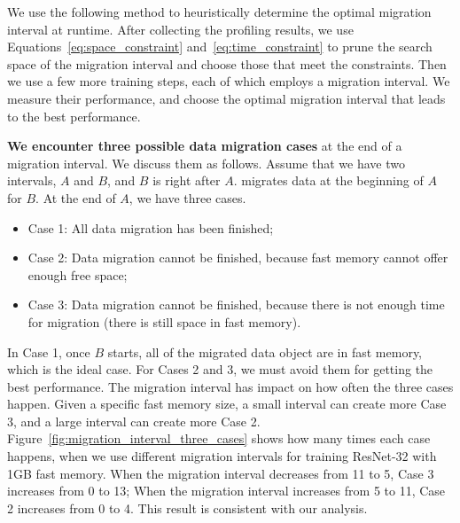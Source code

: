 We use the following method to \textcolor{dong2}{heuristically }determine the optimal migration interval at runtime. After collecting the profiling results, we use Equations~\ref{eq:space_constraint} and~\ref{eq:time_constraint} to prune the search space of the migration interval and choose those that meet the constraints. Then we use a few more training steps, each of which employs a migration interval. We measure their performance, and choose the optimal migration interval that leads to the best performance. %


\textbf{We encounter three possible data migration cases} at the end of a migration interval. We discuss them as follows. Assume that we have two intervals, $A$ and $B$, and $B$ is right after $A$. \name migrates data at the beginning of $A$ for $B$. At the end of $A$, we have three cases. %
\begin{itemize}[leftmargin=*]
    \item Case 1: All data migration has been finished;
    \item Case 2: Data migration cannot be finished, because fast memory cannot offer enough free space;
    \item Case 3: Data migration cannot be finished, because there is not 
    enough time for migration (there is still space in fast memory).
\end{itemize}

In Case 1, once $B$ starts, all of the migrated data object are in fast memory, which is the ideal case. For Cases 2 and 3, we must avoid them for getting the best performance. %
The migration interval has impact on how often the three cases happen. Given a specific fast memory size, a small interval can create more Case 3, and a large interval can create more Case 2. Figure~\ref{fig:migration_interval_three_cases} shows how many times each case happens, when we use different migration intervals for training ResNet-32 with 1GB fast memory. When the migration interval decreases from 11 to 5, Case 3 increases from 0 to 13; When the migration interval increases from 5 to 11, Case 2 increases from 0 to 4. This result is consistent with our analysis.

